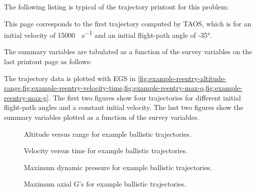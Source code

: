 The following listing is typical of the trajectory printout for this problem:

\begin{center}
\begin{minipage}{0.98\linewidth}

\end{minipage}
\end{center}

This page corresponds to the first trajectory computed by TAOS, which is for an
initial velocity of \SI{15000}{\foot\per\second} and an initial flight-path angle of
\ang{-35}.

The summary variables are tabulated as a function of the survey variables on the last
printout page as follows:

\begin{center}
\begin{minipage}{0.86\linewidth}

\end{minipage}
\end{center}

The trajectory data is plotted with EGS in
\cref{fig:example-reentry-altitude-range,fig:example-reentry-velocity-time,fig:example-reentry-max-q,fig:example-reentry-max-g}.
The first two figures show four trajectories for different initial flight-path angles and
a constant initial velocity. The last two figures show the summary variables plotted
as a function of the survey variables.

\begin{figure}[htbp]
  \centering
  \resizebox{0.84\linewidth}{!}{}
  \caption{Altitude versus range for example ballistic trajectories.}
  \label{fig:example-reentry-altitude-range}
\end{figure}

\begin{figure}[htbp]
  \centering
  \resizebox{0.84\linewidth}{!}{}
  \caption{Velocity versus time for example ballistic trajectories.}
  \label{fig:example-reentry-velocity-time}
\end{figure}

\begin{figure}[htbp]
  \centering
  \resizebox{0.84\linewidth}{!}{}
  \caption{Maximum dynamic pressure for example ballistic trajectories.}
  \label{fig:example-reentry-max-q}
\end{figure}

\begin{figure}[htbp]
  \centering
  \resizebox{0.84\linewidth}{!}{}
  \caption{Maximum axial G's for example ballistic trajectories.}
  \label{fig:example-reentry-max-g}
\end{figure}
